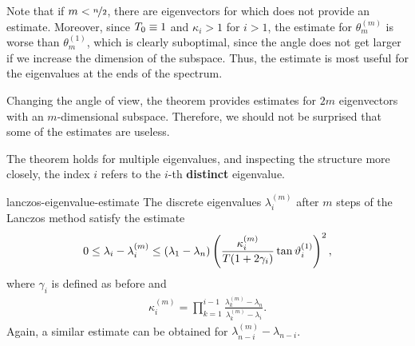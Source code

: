 \begin{remark}
  Note that if $m<\nicefrac{n}2$, there are eigenvectors for which
   does not provide an
  estimate. Moreover, since $T_0\equiv 1$ and $\kappa_i>1$
  for $i>1$, the estimate for $\theta_m^{(m)}$ is worse than
  $\theta_m^{(1)}$, which is clearly suboptimal, since the angle does
  not get larger if we increase the dimension of the subspace. Thus,
  the estimate is most useful for the eigenvalues at the ends of the
  spectrum.

  Changing the angle of view, the theorem provides estimates for $2m$
  eigenvectors with an $m$-dimensional subspace. Therefore, we should
  not be surprised that some of the estimates are useless.

  The theorem holds for multiple eigenvalues, and inspecting the
  structure more closely, the index $i$ refers to the $i$-th
  \textbf{distinct} eigenvalue.
\end{remark}

\begin{Theorem}{lanczos-eigenvalue-estimate}
  The discrete eigenvalues $\lambda_i^{(m)}$ after $m$ steps of the Lanczos method satisfy the estimate
  \begin{gather}
    0\le \lambda_i-\lambda_i^{(m)}
    \le (\lambda_1-\lambda_n) \left(
      \frac{\kappa_i^{(m)}}{T(1+2\gamma_i)}
      \tan\vartheta_i^{(1)}\right)^2,
    \end{gather}
    where $\gamma_i$ is defined as before and
    \begin{gather}
    \kappa_i^{(m)}=\prod_{k=1}^{i-1} \frac{\lambda_k^{(m)}-\lambda_n}{\lambda_k^{(m)}-\lambda_i}.
  \end{gather}
  Again, a similar estimate can be obtained for $\lambda_{n-i}^{(m)} - \lambda_{n-i}$.
\end{Theorem}

